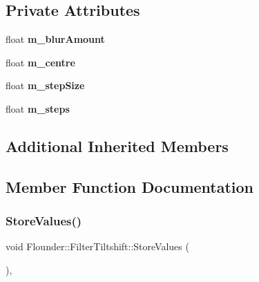 \subsection*{Private Attributes}
\begin{DoxyCompactItemize}
\item 
\mbox{\label{class_flounder_1_1_filter_tiltshift_a74e8e4e65a6e3168038bd2dbae523d8d}} 
float {\bfseries m\+\_\+blur\+Amount}
\item 
\mbox{\label{class_flounder_1_1_filter_tiltshift_a3e9b63ffacde27b3b9d0058838af52a3}} 
float {\bfseries m\+\_\+centre}
\item 
\mbox{\label{class_flounder_1_1_filter_tiltshift_aadb58f9911f529f109de86a45a0db8f4}} 
float {\bfseries m\+\_\+step\+Size}
\item 
\mbox{\label{class_flounder_1_1_filter_tiltshift_ad436ecf3ccae193d40e44ff73a2403c3}} 
float {\bfseries m\+\_\+steps}
\end{DoxyCompactItemize}
\subsection*{Additional Inherited Members}


\subsection{Member Function Documentation}
\mbox{\label{class_flounder_1_1_filter_tiltshift_a0131c0901e648cff5ee3e3239f04e8e5}} 
\subsubsection{\texorpdfstring{Store\+Values()}{StoreValues()}}
{\footnotesize\ttfamily void Flounder\+::\+Filter\+Tiltshift\+::\+Store\+Values (\begin{DoxyParamCaption}{ }\end{DoxyParamCaption})\hspace{0.3cm}{\ttfamily [override]}, {\ttfamily [virtual]}}



